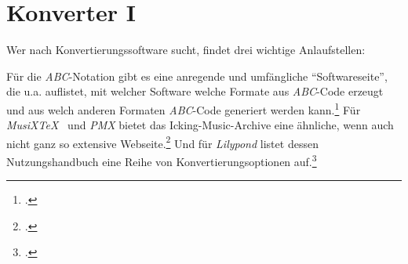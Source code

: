 %
%
%



\section{Konverter I}

Wer nach Konvertierungssoftware sucht, findet drei wichtige Anlaufstellen:

Für die \textit{ABC}-Notation gibt es eine anregende und umfängliche
\enquote{Softwareseite}, die u.a. auflistet, mit welcher Software welche Formate
aus \textit{ABC}-Code erzeugt und aus welch anderen Formaten \textit{ABC}-Code
generiert werden kann.\footcite[vgl.][\nopage wp]{Abc2018b} Für
\textit{MusiX\TeX\ } und \textit{PMX} bietet das Icking-Music-Archive eine
ähnliche, wenn auch nicht ganz so extensive Webseite.\footcite[vgl.][\nopage
wp]{Tennent2018b} Und für \textit{Lilypond} listet dessen Nutzungshandbuch eine
Reihe von Konvertierungsoptionen auf.\footcite[vgl.][42ff]{LilyPond2018e}

